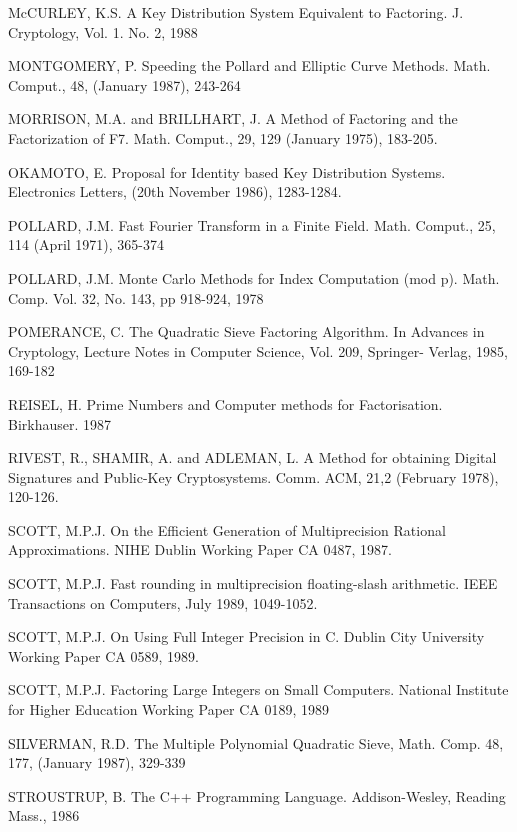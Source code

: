 \begin{thebibliography}{99}
      McCURLEY, K.S. A Key Distribution System Equivalent to Factoring. J.
      Cryptology, Vol. 1. No. 2, 1988

      MONTGOMERY, P. Speeding the Pollard and Elliptic Curve Methods. 
      Math. Comput., 48, (January 1987), 243-264

      MORRISON,  M.A.  and  BRILLHART,  J.  A  Method  of Factoring and the 
      Factorization of F7. Math. Comput., 29, 129 (January 1975), 183-205.  

      OKAMOTO, E. Proposal for Identity based Key Distribution Systems. 
      Electronics Letters, (20th November 1986), 1283-1284. 

      POLLARD, J.M. Fast Fourier Transform in a Finite Field. Math. 
      Comput., 25, 114 (April 1971), 365-374

      POLLARD, J.M. Monte Carlo Methods for Index Computation (mod p). Math.
      Comp. Vol. 32, No. 143, pp 918-924, 1978

      POMERANCE,  C. The Quadratic Sieve Factoring Algorithm. In Advances
      in Cryptology, Lecture Notes in Computer Science, Vol. 209, Springer-
      Verlag, 1985, 169-182

      REISEL, H. Prime Numbers and Computer methods for Factorisation. 
      Birkhauser. 1987
      
      RIVEST, R., SHAMIR, A. and ADLEMAN, L. A Method for obtaining Digital 
      Signatures and Public-Key Cryptosystems.  Comm.  ACM,  21,2 (February 
      1978), 120-126.  

      SCOTT, M.P.J.  On the Efficient Generation of Multiprecision Rational 
      Approximations. NIHE Dublin Working Paper CA 0487, 1987.

      SCOTT, M.P.J.   Fast  rounding  in  multiprecision   floating-slash 
      arithmetic.  IEEE Transactions on Computers, July 1989, 1049-1052.

      SCOTT, M.P.J.  On Using Full Integer Precision in C. Dublin City 
      University Working Paper CA 0589, 1989.
      
      SCOTT, M.P.J. Factoring Large Integers on Small Computers. National
      Institute for Higher Education Working Paper CA 0189, 1989

      SILVERMAN, R.D. The Multiple Polynomial Quadratic Sieve, Math. Comp.
      48, 177, (January 1987), 329-339

      STROUSTRUP, B. The C++ Programming Language. Addison-Wesley, Reading
      Mass., 1986

\end{thebibliography}



